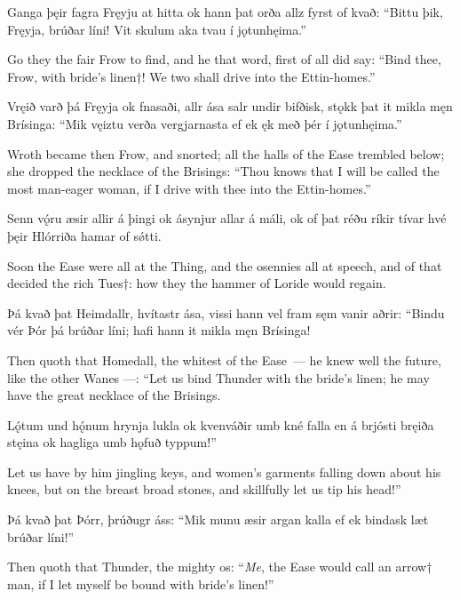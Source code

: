 Ganga þęir fagra \hld Fręyju at hitta
ok hann þat orða \hld allz fyrst of kvað:
“Bittu þik, Fręyja, \hld brúðar líni!
Vit skulum aka tvau \hld í jǫtunhęima.”

Go they the fair Frow to find, and he that word, first of all did say: “Bind thee, Frow, with bride’s linen†! We two shall drive into the Ettin-homes.”

Vręið varð þá Fręyja \hld ok fnasaði,
allr ása salr \hld undir bifðisk,
stǫkk þat it mikla \hld męn Brísinga:
“Mik vęiztu verða \hld vergjarnasta
ef ek ęk með þér \hld í jǫtunhęima.”

Wroth became then Frow, and snorted; all the halls of the Ease trembled below; she dropped the necklace of the Brisings: “Thou knows that I will be called the most man-eager woman, if I drive with thee into the Ettin-homes.”

Senn vǫ́ru æsir \hld allir á þingi
ok ásynjur \hld allar á máli,
ok of þat réðu \hld ríkir tívar
hvé þęir Hlórriða \hld hamar of sǿtti.

Soon the Ease were all at the Thing, and the osennies all at speech, and of that decided the rich Tues†: how they the hammer of Loride would regain\footnotemark[1].

Þá kvað þat Heimdallr, \hld hvítastr ása,
vissi hann vel fram \hld sęm vanir aðrir:
“Bindu vér Þór þá \hld brúðar líni;
hafi hann it mikla \hld męn Brísinga!

Then quoth that Homedall, the whitest of the Ease — he knew well the future, like the other Wanes —: “Let us bind Thunder with the bride's linen; he may have the great necklace of the Brisings.

Lǫ́tum und hǫ́num \hld hrynja lukla
ok kvenváðir \hld umb kné falla
en á brjósti \hld bręiða stęina
ok hagliga \hld umb hǫfuð typpum!”

Let us have by him jingling keys\footnotemark[1], and women's garments falling down about his knees, but on the breast broad stones\footnotemark[2], and skillfully let us tip his head!\footnotemark[3]”

Þá kvað þat Þórr, \hld þrúðugr áss:
“Mik munu æsir \hld argan kalla
ef ek bindask læt \hld brúðar líni!”

Then quoth that Thunder, the mighty os: “\emph{Me}, the Ease would call an arrow† man, if I let myself be bound with bride’s linen!”


